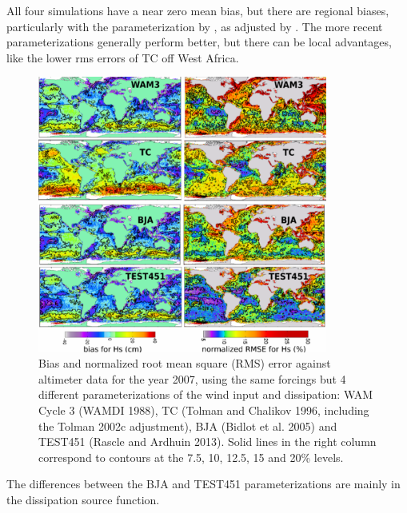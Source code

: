 All four simulations have a near zero mean bias, but there are regional biases, particularly  
with the parameterization by \cite{Tolman&Chalikov1996}, as adjusted by \cite{Tolman2002e}. The more recent 
parameterizations generally perform better, but there can be local advantages, like the lower rms errors of TC off 
West Africa. 
\begin{figure}[htb]
\noindent \begin{centering}
  \includegraphics[width=0.85\textwidth]{FIGS_CH_MODEL/Hs_bias_RMSE_RA2014_small.pdf}
\par\end{centering}

\caption{Bias and normalized root mean square (RMS) error against altimeter data for the year 2007, using the same forcings but 4 different 
parameterizations of the wind input and dissipation: WAM Cycle 3 (WAMDI 1988), TC (Tolman and Chalikov 1996, including the Tolman 2002c
adjustment), 
BJA (Bidlot et al. 2005) and TEST451  (Rascle and Ardhuin 2013). Solid lines in the right column correspond to contours at the 7.5, 10, 12.5, 15 and 20\% levels. } 
\label{fig:global_err1}       %
\end{figure}
The differences between the BJA and TEST451 parameterizations are mainly in the dissipation source function. 

